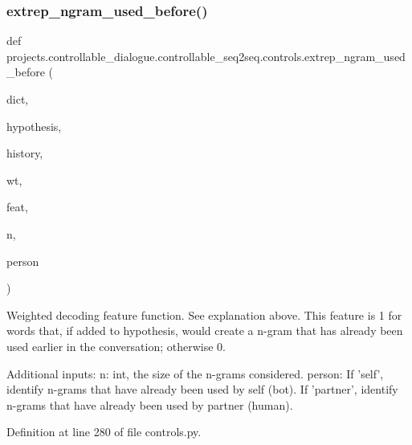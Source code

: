 \subsubsection{\texorpdfstring{extrep\+\_\+ngram\+\_\+used\+\_\+before()}{extrep\_ngram\_used\_before()}}
{\footnotesize\ttfamily def projects.\+controllable\+\_\+dialogue.\+controllable\+\_\+seq2seq.\+controls.\+extrep\+\_\+ngram\+\_\+used\+\_\+before (\begin{DoxyParamCaption}\item[{}]{dict,  }\item[{}]{hypothesis,  }\item[{}]{history,  }\item[{}]{wt,  }\item[{}]{feat,  }\item[{}]{n,  }\item[{}]{person }\end{DoxyParamCaption})}

\begin{DoxyVerb}Weighted decoding feature function. See explanation above. This feature is 1 for
words that, if added to hypothesis, would create a n-gram that has already been used
earlier in the conversation; otherwise 0.

Additional inputs:
  n: int, the size of the n-grams considered.
  person: If 'self', identify n-grams that have already been used by self (bot).
    If 'partner', identify n-grams that have already been used by partner (human).
\end{DoxyVerb}
 

Definition at line 280 of file controls.\+py.


